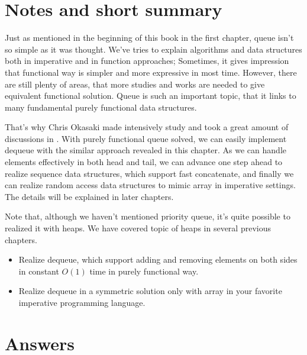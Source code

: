 \documentclass[b5paper]{article}
\begin{document}
\section{Notes and short summary}
Just as mentioned in the beginning of this book in the first chapter,
queue isn't so simple as it was thought. We've tries to explain
algorithms and data structures both in imperative and in function
approaches; Sometimes, it gives impression that functional way is
simpler and more expressive in most time. However, there are still
plenty of areas, that more studies and works are needed to give equivalent
functional solution. Queue is such an important topic, that it
links to many fundamental purely functional data structures.

That's why Chris Okasaki made intensively study and took a great
amount of discussions in \cite{okasaki-book}. With purely functional
queue solved, we can easily implement dequeue with the similar
approach revealed in this chapter. As we can handle elements effectively
in both head and tail, we can advance one step ahead to realize
sequence data structures, which support fast concatenate, and
finally we can realize random access data structures to mimic
array in imperative settings. The details will be explained
in later chapters.

Note that, although we haven't mentioned priority queue, it's quite
possible to realized it with heaps. We have covered topic of heaps
in several previous chapters.

\begin{Exercise}
\begin{itemize}
\item Realize dequeue, which support adding and removing elements on both sides in
constant $O(1)$ time in purely functional way.
\item Realize dequeue in a symmetric solution only with array in your
favorite imperative programming language.
\end{itemize}
\end{Exercise}

\ifx\wholebook\relax \else
\section{Answers}
\shipoutAnswer
\end{document}
